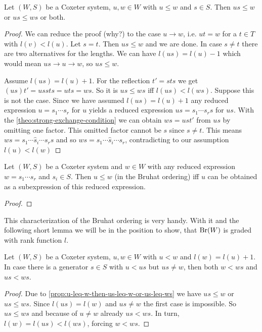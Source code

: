 \begin{prop}
	Let $(W,S)$ be a Coxeter system, $u,w \in W$ with $u \leq w$ and $s \in S$. Then $us \leq w$ or $us \leq ws$ or both.

	\begin{proof}
		We can reduce the proof (\todo why?) to the case $u \to w$, i.e. $ut = w$ for a $t \in T$ with $l(v) < l(u)$. Let $s = t$. Then $us \leq w$ and we are done. In case $s \neq t$ there are two alternatives for the lengths. We can have $l(us) = l(u) - 1$ which would mean $us \to u \to w$, so $us \leq w$.

		Assume $l(us) = l(u) + 1$. For the reflection $t' = sts$ we get $(us)t' = ussts = uts = ws$. So it is $us \leq ws$ iff $l(us) < l(ws)$. Suppose this is not the case. Since we have assumed $l(us) = l(u) + 1$ any reduced expression $u = s_1 \cdots s_r$ for $u$ yields a reduced expression $us = s_1 \cdots s_r s$ for $us$. With the \ref{theo:strong-exchange-condition} we can obtain $ws = ust'$ from $us$ by omitting one factor. This omitted factor cannot be $s$ since $s \neq t$. This means $ws = s_1 \cdots \hat s_i \cdots s_r s$ and so $ws = s_1 \cdots \hat s_i \cdots s_r$, contradicting to our assumption $l(u) < l(w)$
	\end{proof}
\end{prop}

\begin{theo}
	Let $(W,S)$ be a Coxeter system and $w \in W$ with any reduced expression $w = s_1 \cdots s_r$ and $s_i \in S$. Then $u \leq w$ (in the Bruhat ordering) iff $u$ can be obtained as a subexpression of this reduced expression.

	\begin{proof}
		\todo
	\end{proof}
\end{theo}

This characterization of the Bruhat ordering is very handy. With it and the following short lemma we will be in the position to show, that $\operatorname{Br}(W)$ is graded with rank function $l$.

\begin{lemm}
	Let $(W,S)$ be a Coxeter system, $u,w \in W$ with $u < w$ and $l(w) = l(u) + 1$. In case there is a generator $s \in S$ with $u < us$ but $us \neq w$, then both $w < ws$ and $us < ws$.

	\begin{proof}
		Due to \ref{prop:u-leq-w-then-us-leq-w-or-us-leq-ws} we have $us \leq w$ or $us \leq ws$. Since $l(us) = l(w)$ and $us \neq w$ the first case is impossible. So $us \leq ws$ and because of $u \neq w$ already $us < ws$. In turn, $l(w) = l(us) < l(ws)$, forcing $w < ws$.
	\end{proof}
\end{lemm}

